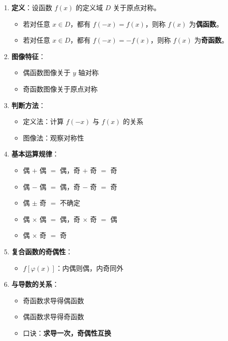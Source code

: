 \documentclass[../book.tex]{subfiles}
\begin{document}
    \begin{enumerate}
        \item \textbf{定义}：设函数 $f(x)$ 的定义域 $D$ 关于原点对称。
        \begin{itemize}
            \item 若对任意 $x \in D$，都有 $f(-x) = f(x)$，则称 $f(x)$ 为\textbf{偶函数}。
            \item 若对任意 $x \in D$，都有 $f(-x) = -f(x)$，则称 $f(x)$ 为\textbf{奇函数}。
        \end{itemize}

        \item \textbf{图像特征}：
        \begin{itemize}
            \item 偶函数图像关于 $y$ 轴对称
            \item 奇函数图像关于原点对称
        \end{itemize}

        \item \textbf{判断方法}：
        \begin{itemize}
            \item 定义法：计算 $f(-x)$ 与 $f(x)$ 的关系
            \item 图像法：观察对称性
        \end{itemize}

        \item \textbf{基本运算规律}：
        \begin{itemize}
            \item 偶 $+$ 偶 $=$ 偶，奇 $+$ 奇 $=$ 奇
            \item 偶 $-$ 偶 $=$ 偶，奇 $-$ 奇 $=$ 奇
            \item 偶 $\pm$ 奇 $=$ 不确定
            \item 偶 $\times$ 偶 $=$ 偶，奇 $\times$ 奇 $=$ 偶
            \item 偶 $\times$ 奇 $=$ 奇
        \end{itemize}

        \item \textbf{复合函数的奇偶性}：
        \begin{itemize}
            \item $f[\varphi(x)]$：内偶则偶，内奇同外
        \end{itemize}

        \item \textbf{与导数的关系}：
        \begin{itemize}
            \item 奇函数求导得偶函数
            \item 偶函数求导得奇函数
            \item 口诀：\textbf{求导一次，奇偶性互换}
        \end{itemize}


\end{enumerate}
\end{document}

